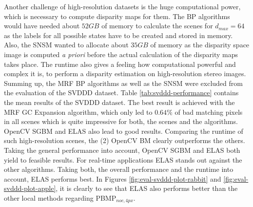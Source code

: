 \noindent Another challenge of high-resolution datasets is the huge computational power, which is necessary to compute disparity maps for them.
The BP algorithms would have needed about $52 GB$ of memory to calculate the scenes for $d_{max} = 64$ as the labels for all possible states have to be created and stored in memory.
Also, the SNSM wanted to allocate about $35 GB$ of memory as the disparity space image is computed \textit{a priori} before the actual calculation of the disparity maps takes place.
The runtime also gives a feeling how computational powerful and complex it is, to perform a disparity estimation on high-resolution stereo images.
Summing up, the MRF BP algorithms as well as the SNSM were excluded from the evaluation of the SVDDD dataset.
\newline\newline\noindent Table \ref{tab:svddd-performance} contains the mean results of the SVDDD dataset.
The best result is achieved with the MRF GC Expansion algorithm, which only led to $0.64\%$ of bad matching pixels in all scenes which is quite impressive for both, the scenes and the algorithms.
OpenCV SGBM and ELAS also lead to good results.
Comparing the runtime of such high-resolution scenes, the (2) OpenCV BM clearly outperforms the others.
Taking the general performance into account, OpenCV SGBM and ELAS both yield to feasible results.
For real-time applications ELAS stands out against the other algorithms.
Taking both, the overall performance and the runtime into account, ELAS performs best.
In Figures \ref{fig:eval-svddd-plot-rabbit} and \ref{fig:eval-svddd-plot-apple}, it is clearly to see that ELAS also performs better than the other local methods regarding PBMP$_{noc,4px}$.

\begin{table}[h!]
\centering
{}
\caption[Result table for general performance of SVDDD]{Result table for general performance of SVDDD, focusing on PBMP$_{noc,1px}$}
\label{tab:svddd-performance}
\end{table}

